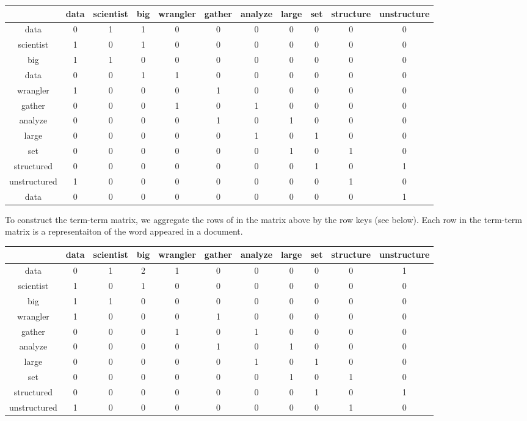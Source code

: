 \documentclass[12pt, oneside]{article}
\begin{document}
\begin{tabular}{c c c c c c c c c c c} 
 \hline
   & data &scientist &big &wrangler &gather &analyze &large &set &structure &unstructure\\ [0.5ex] 
 \hline\hline
 data & 0 &1 &1 &0 &0 &0 &0 &0 &0 &0\\ 
 \hline
 scientist & 1 &0 &1 &0 &0 &0 &0 &0 &0 &0\\
 \hline
 big  & 1 &1 &0 &0 &0 &0 &0 &0 &0 &0\\
 \hline
 data& 0 &0 &1 &1 &0 &0 &0 &0 &0 &0\\
 \hline
 wrangler & 1 &0 &0 &0 &1 &0 &0 &0 &0 &0\\
 \hline
 gather& 0 &0 &0 &1 &0 &1 &0 &0 &0 &0\\
 \hline
 analyze& 0 &0 &0 &0 &1 &0 &1 &0 &0 &0\\
 \hline
 large& 0 &0 &0 &0 &0 &1 &0 &1 &0 &0\\
 \hline
 set& 0 &0 &0 &0 &0 &0 &1 &0 &1 &0\\
 \hline
 structured& 0 &0 &0 &0 &0 &0 &0 &1 &0 &1\\
 \hline
 unstructured& 1 &0 &0 &0 &0 &0 &0 &0 &1 &0\\
 \hline 
 data& 0 &0 &0 &0 &0 &0 &0 &0 &0 &1 \\
 \hline
\end{tabular}

To construct the term-term matrix, we aggregate the rows of in the matrix above by the row keys (see below). Each row in the term-term matrix is a representaiton of the word appeared in a document.

\begin{tabular}{c c c c c c c c c c c} 
 \hline
   & data &scientist &big &wrangler &gather &analyze &large &set &structure &unstructure\\ [0.5ex] 
 \hline\hline
 data & 0 &1 &2 &1 &0 &0 &0 &0 &0 &1\\ 
 \hline
 scientist & 1 &0 &1 &0 &0 &0 &0 &0 &0 &0\\
 \hline
 big  & 1 &1 &0 &0 &0 &0 &0 &0 &0 &0\\
 \hline
 wrangler & 1 &0 &0 &0 &1 &0 &0 &0 &0 &0\\
 \hline
 gather& 0 &0 &0 &1 &0 &1 &0 &0 &0 &0\\
 \hline
 analyze& 0 &0 &0 &0 &1 &0 &1 &0 &0 &0\\
 \hline
 large& 0 &0 &0 &0 &0 &1 &0 &1 &0 &0\\
 \hline
 set& 0 &0 &0 &0 &0 &0 &1 &0 &1 &0\\
 \hline
 structured& 0 &0 &0 &0 &0 &0 &0 &1 &0 &1\\
 \hline
 unstructured& 1 &0 &0 &0 &0 &0 &0 &0 &1 &0\\
 \hline 
 \hline
\end{tabular}
\end{document}

